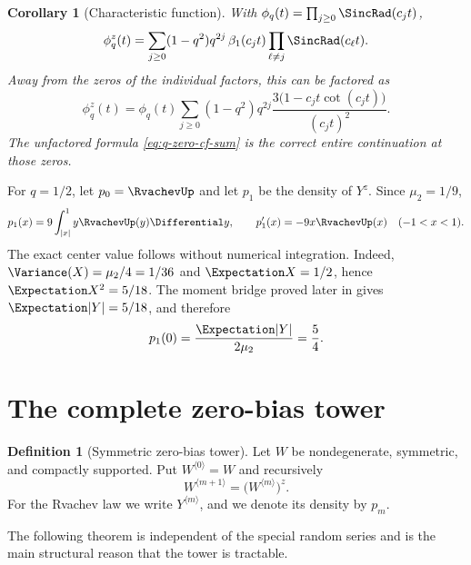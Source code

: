 \documentclass[11pt,oneside]{article}
\newtheorem{corollary}[theorem]{Corollary}
\theoremstyle{definition}
\newtheorem{definition}[theorem]{Definition}
\theoremstyle{remark}
\newcommand{\Tower}[1]{Y^{\langle #1\rangle}}
\begin{document}
\begin{corollary}[Characteristic function]
\label{cor:q-zero-cf}
With $\phi_q(t)=\prod_{j\ge0}\SincRad(c_jt)$,
\begin{equation}
 \phi_q^z(t)
 =\sum_{j\ge0}(1-q^2)q^{2j}\,
   \beta_1(c_jt)\prod_{\ell\ne j}\SincRad(c_\ell t).   \label{eq:q-zero-cf-sum}
\end{equation}
Away from the zeros of the individual factors, this can be factored as
\begin{equation}
 \phi_q^z(t)
 =\phi_q(t)\sum_{j\ge0}(1-q^2)q^{2j}
   \frac{3\bigl(1-c_jt\cot(c_jt)\bigr)}{(c_jt)^2}.   \label{eq:q-zero-cf-factored}
\end{equation}
The unfactored formula \eqref{eq:q-zero-cf-sum} is the correct entire
continuation at those zeros.
\end{corollary}

For $q=1/2$, let $p_0=\RvachevUp$ and let $p_1$ be the density of $Y^z$.  Since
$\mu_2=1/9$,
\begin{equation}
 p_1(x)=9\int_{|x|}^{1}y\RvachevUp(y)\Differential y,
 \qquad p_1'(x)=-9x\RvachevUp(x)\quad(-1<x<1).              \label{eq:first-density}
\end{equation}
The exact center value follows without numerical integration.  Indeed,
$\Variance(X)=\mu_2/4=1/36$ and $\Expectation X=1/2$, hence
$\Expectation X^2=5/18$.  The moment bridge proved later in
 gives $\Expectation|Y|=5/18$, and therefore
\begin{equation}
 p_1(0)=\frac{\Expectation|Y|}{2\mu_2}=\frac54.               \label{eq:p1-center}
\end{equation}

\section{The complete zero-bias tower}
\label{sec:tower}

\begin{definition}[Symmetric zero-bias tower]
Let $W$ be nondegenerate, symmetric, and compactly supported.  Put
$W^{\langle0\rangle}=W$ and recursively
\begin{equation}
 W^{\langle m+1\rangle}
 =\bigl(W^{\langle m\rangle}\bigr)^z.               \label{eq:tower-def}
\end{equation}
For the Rvachev law we write $\Tower{m}$, and we denote its density by $p_m$.
\end{definition}

The following theorem is independent of the special random series and is the
main structural reason that the tower is tractable.
\end{document}
